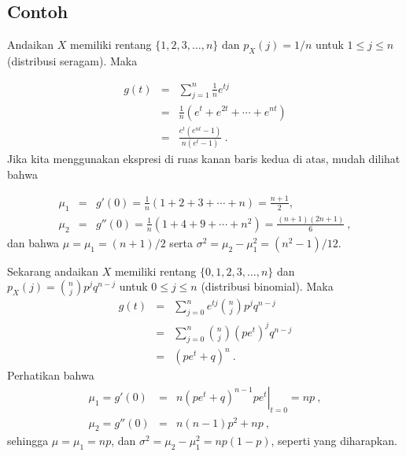 \subsection*{Contoh}
\begin{example}\label{exam 10.1}
Andaikan $X$ memiliki rentang $\{1,2,3,\ldots,n\}$ dan $p_X(j) = 1/n$ untuk $1 \leq j
\leq n$ (distribusi seragam).  Maka

\begin{eqnarray*}
g(t) &=& \sum_{j = 1}^n \frac 1n e^{tj} \\
     &=& \frac 1n (e^t + e^{2t} +\cdots+ e^{nt}) \\
     &=& \frac {e^t (e^{nt} - 1)} {n (e^t - 1)}\ .
\end{eqnarray*}
Jika kita menggunakan ekspresi di ruas kanan baris kedua di atas, mudah dilihat bahwa

\begin{eqnarray*}
\mu_1 &=& g'(0) = \frac 1n (1 + 2 + 3 + \cdots + n) = \frac {n + 1}2, \\
\mu_2 &=& g''(0) = \frac 1n (1 + 4 + 9+ \cdots + n^2) = \frac {(n + 1)(2n + 1)}6\ ,
\end{eqnarray*}
dan bahwa $\mu = \mu_1 = (n + 1)/2$ serta $\sigma^2 = \mu_2 - \mu_1^2 = (n^2 -
1)/12$.
\end{example}

\begin{example}\label{exam 10.2}
Sekarang andaikan $X$ memiliki rentang $\{0,1,2,3,\ldots,n\}$ dan $p_X(j) = {n \choose j} p^j
q^{n - j}$ untuk $0 \leq j \leq n$ (distribusi binomial).  Maka
\begin{eqnarray*}
g(t) &=& \sum_{j = 0}^n e^{tj} {n \choose j} p^j q^{n - j} \\
     &=& \sum_{j = 0}^n {n \choose j} (pe^t)^j q^{n - j} \\
     &=& (pe^t + q)^n\ .
\end{eqnarray*}
Perhatikan bahwa
\begin{eqnarray*}
\mu_1 = g'(0) &=& \left. n(pe^t + q)^{n - 1}pe^t \right|_{t = 0} = np\ , \\
\mu_2 = g''(0) &=& n(n - 1)p^2 + np\ ,
\end{eqnarray*}
sehingga $\mu = \mu_1 = np$, dan $\sigma^2 = \mu_2 - \mu_1^2 = np(1 - p)$, seperti
yang diharapkan.
\end{example}


